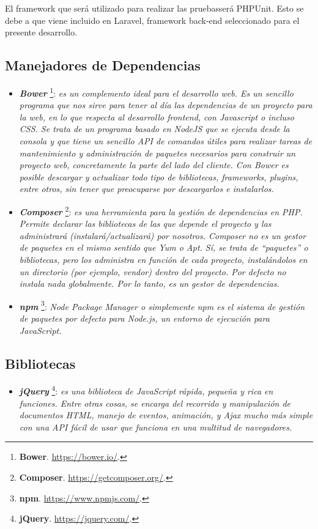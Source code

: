 \documentclass[11pt,oneside]{book}
\begin{document}
El framework que será utilizado para realizar las pruebasserá PHPUnit. Esto se debe a que viene incluido en Laravel, framework back-end seleccionado para el presente desarrollo. 

\subsection{Manejadores de Dependencias}
\begin{itemize}
\item \textit{\textbf{Bower}} \footnote{\textbf{Bower}. \url{https://bower.io/}.}: \textit{es un complemento ideal para el desarrollo web. Es un sencillo programa que nos sirve para tener al día las dependencias de un proyecto para la web, en lo que respecta al desarrollo frontend, con Javascript o incluso CSS. Se trata de un programa basado en NodeJS que se ejecuta desde la consola y que tiene un sencillo API de comandos útiles para realizar tareas de mantenimiento y administración de paquetes necesarios para construir un proyecto web, concretamente la parte del lado del cliente. Con Bower es posible descargar y actualizar todo tipo de bibliotecas, frameworks, plugins, entre otros, sin tener que preocuparse por descargarlos e instalarlos.}
\item \textit{\textbf{Composer}} \footnote{\textbf{Composer}. \url{https://getcomposer.org/}.}: \textit{es una herramienta para la gestión de dependencias en PHP. Permite declarar las bibliotecas de las que depende el proyecto y las administrará (instalará/actualizará) por nosotros. Composer no es un gestor de paquetes en el mismo sentido que Yum o Apt. Sí, se trata de ``paquetes'' o bibliotecas, pero los administra en función de cada proyecto, instalándolos en un directorio (por ejemplo, vendor) dentro del proyecto. Por defecto no instala nada globalmente. Por lo tanto, es un gestor de dependencias.}
\item \textit{\textbf{npm}} \footnote{\textbf{npm}. \url{https://www.npmjs.com/}.}: \textit{Node Package Manager o simplemente npm es el sistema de gestión de paquetes por defecto para Node.js, un entorno de ejecución para JavaScript.}
\end{itemize}

\newpage
\subsection{Bibliotecas}
\begin{itemize}
\item \textit{\textbf{jQuery}} \footnote{\textbf{jQuery}. \url{https://jquery.com/}.}: \textit{es una biblioteca de JavaScript rápida, pequeña y rica en funciones. Entre otras cosas, se encarga del recorrido y manipulación de documentos HTML, manejo de eventos, animación, y Ajax mucho más simple con una API fácil de usar que funciona en una multitud de navegadores.}
\end{itemize}
\end{document}
